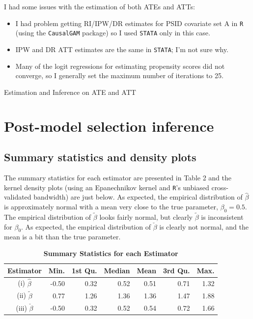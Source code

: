 \documentclass[12pt]{article}
\begin{document}
I had some issues with the estimation of both ATEs and ATTs:
\begin{itemize}
\item I had problem getting RI/IPW/DR estimates for PSID covariate set A in \verb|R| (using the \verb|CausalGAM| package) so I used \verb|STATA| only in this case.
\item IPW and DR ATT estimates are the same in \verb|STATA|; I'm not sure why.
\item Many of the logit regressions for estimating propensity scores did not converge, so I generally set the maximum number of iterations to 25.
\end{itemize}



\begin{landscape}
\begin{table}
\centering
\caption{Estimation and Inference on ATE and ATT}\label{tab:tableQ2}
\vspace{-.1in}\resizebox{\columnwidth}{!}{
\subfloat[][ATE]{}\quad
\subfloat[][ATT]{}
}
\end{table}
\end{landscape}

\newpage

\section{Post-model selection inference}

\subsection{Summary statistics and density plots}
The summary statistics for each estimator are presented in Table 2 and the kernel density plots (using an Epanechnikov kernel and \verb|R|'s unbiased cross-validated bandwidth) are just below. As expected, the empirical distribution of $\hat{\beta}$ is approximately normal with a mean very close to the true parameter, $\beta_0=0.5$. The empirical distribution of $\tilde{\beta}$ looks fairly normal, but clearly $\tilde{\beta}$ is inconsistent for $\beta_0$. As expected, the empirical distribution of $\check{\beta}$ is clearly not normal, and the mean is a bit than the true parameter.

\begin{table}[!htpb]
\centering
\caption{\textbf{Summary Statistics for each Estimator}}
\begin{tabular}{crrrrrr}
  \hline
Estimator & Min. & 1st Qu. & Median & Mean & 3rd Qu. & Max. \\ 
  \hline
(i) $\hat{\beta}$ & -0.50 & 0.32 & 0.52 & 0.51 & 0.71 & 1.32 \\ 
(ii) $\tilde{\beta}$ & 0.77 & 1.26 & 1.36 & 1.36 & 1.47 & 1.88 \\ 
(iii) $ \check{\beta}$& -0.50 & 0.32 & 0.52 & 0.54 & 0.72 & 1.66 \\ 
   \hline
\end{tabular}
\end{table}
\end{document}
